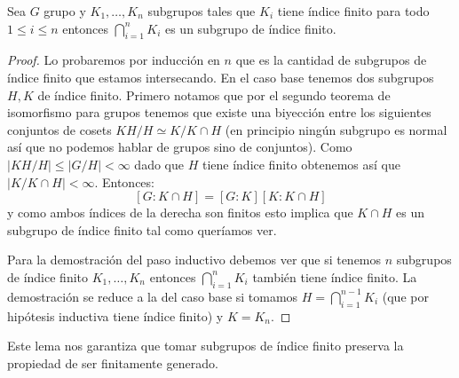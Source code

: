 \documentclass[tesis.tex]{subfiles}
\begin{document}
\begin{lema}\label{lema_indice_interseccion}
	Sea $G$ grupo y $K_1, \dots, K_n$ subgrupos tales que $K_{i}$ tiene índice finito para todo $ 1 \le i \le n $ entonces $\bigcap_{i=1}^{n} K_{i}$ es un subgrupo de índice finito.
\end{lema}
\begin{proof}
	Lo probaremos por inducción en $n$ que es la cantidad de subgrupos de índice finito que estamos intersecando.
	En el caso base tenemos dos subgrupos $H,K$ de índice finito.
	Primero notamos que por el segundo teorema de isomorfismo para grupos tenemos que existe una biyección entre los siguientes conjuntos de cosets $ KH / H \simeq K / K \cap H $ (en principio ningún subgrupo es normal así que no podemos hablar de grupos sino de conjuntos).
	Como  $|KH / H| \le |G / H| < \infty$ dado que $H$ tiene índice finito obtenemos así que $|K / K \cap H| < \infty$.
	Entonces:
	\[
	[G:K\cap H] = [G:K][K: K \cap H]
	\]
	y como ambos índices de la derecha son finitos esto implica que $K \cap H$ es un subgrupo de índice finito tal como queríamos ver.
	
	Para la demostración del paso inductivo debemos ver que si tenemos $n$ subgrupos de índice finito $K_{1}, \dots, K_{n}$ entonces $\bigcap_{i=1}^{n} K_{i}$ también tiene índice finito.
	La demostración se reduce a la del caso base si tomamos $H = \bigcap_{i=1}^{n-1} K_{i}$ (que por hipótesis inductiva tiene índice finito) y $K = K_{n}$.
\end{proof}

Este lema nos garantiza que tomar subgrupos de índice finito preserva la propiedad de ser finitamente generado.
\end{document}
